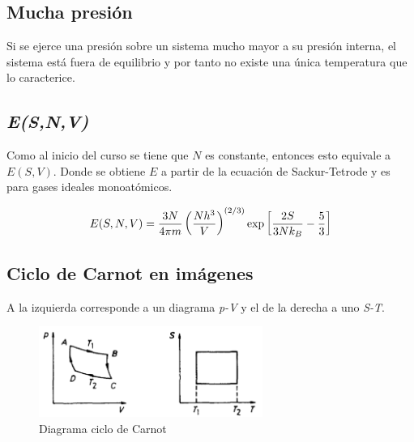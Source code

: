 \subsection{Mucha presión}

Si se ejerce una presión sobre un sistema mucho mayor a su presión interna, el sistema está fuera de equilibrio y por tanto no existe una única temperatura que lo caracterice.

\subsection{\textit{E(S,N,V)}}
\label{eq:e(s,v,n)}
Como al inicio del curso se tiene que $N$ es constante, entonces esto equivale a $E(S,V)$. Donde se obtiene $E$ a partir de la ecuación de Sackur-Tetrode y es para gases ideales monoatómicos.

\[ E(S,N,V) = \frac{3N}{4 \pi m}\lados{(}{\frac{Nh^3}{V}}^{(2/3)}\text{exp}\lados{[}{\frac{2S}{3Nk_B} - \frac{5}{3}} \]

\subsection{Ciclo de Carnot en imágenes}
A la izquierda corresponde a un diagrama \textit{p-V} y el de la derecha a uno \textit{S-T}.

\begin{figure}[H]
    \centering
    \includegraphics[width=0.65\textwidth]{img/ciclo_carnot.png}
    \caption{Diagrama ciclo de Carnot}
    \label{fig:diag_carnot}
\end{figure}